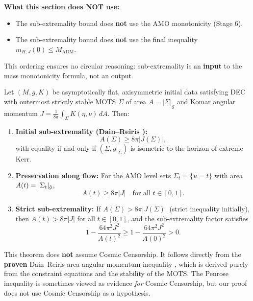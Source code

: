 \textbf{What this section does NOT use:}
\begin{itemize}
    \item The sub-extremality bound does \textbf{not} use the AMO monotonicity (Stage 6).
    \item The sub-extremality bound does \textbf{not} use the final inequality $m_{H,J}(0) \leq M_{\mathrm{ADM}}$.
\end{itemize}
This ordering ensures no circular reasoning: sub-extremality is an \textbf{input} to the mass monotonicity formula, not an output.
\begin{theorem}\label{thm:subext}
Let $(M, g, K)$ be asymptotically flat, axisymmetric initial data satisfying DEC with outermost strictly stable MOTS $\Sigma$ of area $A = |\Sigma|_g$ and Komar angular momentum $J = \frac{1}{8\pi}\int_\Sigma K(\eta, \nu)\,dA$. Then:
\begin{enumerate}[label=\textup{(\roman*)}]
    \item \textbf{Initial sub-extremality (Dain--Reiris \cite{dain2011}):}
    \[
    A(\Sigma) \geq 8\pi|J(\Sigma)|,
    \]
    with equality if and only if $(\Sigma, g|_\Sigma)$ is isometric to the horizon of extreme Kerr.
    \item \textbf{Preservation along flow:} For the AMO level sets $\Sigma_t = \{u = t\}$ with area $A(t) = |\Sigma_t|_{\tilde{g}}$,
    \[
    A(t) \geq 8\pi|J| \quad \text{for all } t \in [0, 1].
    \]
    \item \textbf{Strict sub-extremality:} If $A(\Sigma) > 8\pi|J(\Sigma)|$ (strict inequality initially), then $A(t) > 8\pi|J|$ for all $t \in [0,1]$, and the sub-extremality factor satisfies
    \[
    1 - \frac{64\pi^2 J^2}{A(t)^2} \geq 1 - \frac{64\pi^2 J^2}{A(0)^2} > 0.
    \]
\end{enumerate}
\end{theorem}

\begin{remark}
This theorem does \textbf{not} assume Cosmic Censorship. It follows directly from the \textbf{proven} Dain--Reiris area-angular momentum inequality \cite{dain2011}, which is derived purely from the constraint equations and the stability of the MOTS. The Penrose inequality is sometimes viewed as evidence \emph{for} Cosmic Censorship, but our proof does not use Cosmic Censorship as a hypothesis.
\end{remark}

